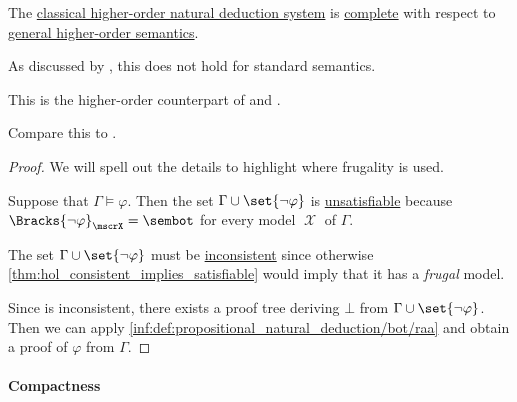 \begin{theorem}\label{thm:hol_weak_completeness}
  The \hyperref[def:fol_natural_deduction]{classical higher-order natural deduction system} is \hyperref[def:general_logic/completeness]{complete} with respect to \hyperref[def:hol_semantics/standard]{general higher-order semantics}.
\end{theorem}
\begin{comments}
  \item As discussed by \textcite{Henkin1950CompletenessInTheoryOfTypes}, this does not hold for standard semantics.

  \item This is the higher-order counterpart of  and .

  \item Compare this to .
\end{comments}
\begin{proof}
  We will spell out the details to highlight where frugality is used.

  Suppose that \( \Gamma \vDash \varphi \). Then the set \( \Gamma \cup \set{ \neg \varphi } \) is \hyperref[def:hol_semantics/satisfaction]{unsatisfiable} because \( \Bracks{\neg \varphi}_\mscrX = \sembot \) for every model \( \mscrX \) of \( \Gamma \).

  The set \( \Gamma \cup \set{ \neg \varphi } \) must be \hyperref[def:hol_theory/consistent]{inconsistent} since otherwise \cref{thm:hol_consistent_implies_satisfiable} would imply that it has a \emph{frugal} model.

  Since is inconsistent, there exists a proof tree deriving \( \bot \) from \( \Gamma \cup \set{ \neg \varphi } \). Then we can apply \ref{inf:def:propositional_natural_deduction/bot/raa} and obtain a proof of \( \varphi \) from \( \Gamma \).
\end{proof}

\paragraph{Compactness}

